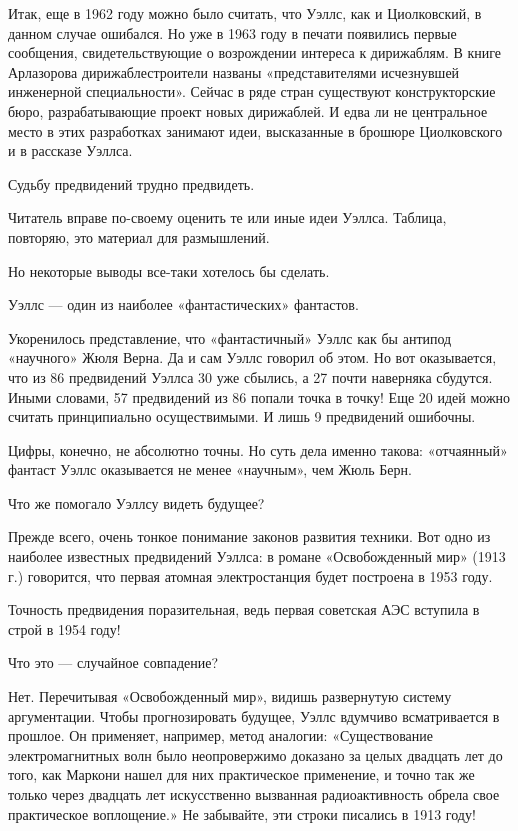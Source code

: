 Итак, еще в 1962 году можно было считать, что Уэллс, как и Циолковский,  в
данном случае  ошибался. Но  уже в  1963 году  в печати  появились  первые
сообщения, свидетельствующие о возрождении интереса к дирижаблям. В  книге
Арлазорова   дирижаблестроители   названы   «представителями   исчезнувшей
инженерной специальности». Сейчас в ряде стран существуют  конструкторские
бюро, разрабатывающие проект  новых дирижаблей. И  едва ли не  центральное
место в этих разработках занимают идеи, высказанные в брошюре Циолковского
и в рассказе Уэллса.

Судьбу предвидений трудно предвидеть.

Читатель вправе  по-своему  оценить  те или  иные  идеи  Уэллса.  Таблица,
повторяю, это материал для размышлений.

Но некоторые выводы все-таки хотелось бы сделать.

Уэллс — один из наиболее «фантастических» фантастов.

Укоренилось  представление,  что  «фантастичный»  Уэллс  как  бы   антипод
«научного» Жюля Верна. Да и сам Уэллс говорил об этом. Но вот оказывается,
что из  86  предвидений  Уэллса  30 уже  сбылись,  а  27  почти  наверняка
сбудутся. Иными словами, 57 предвидений из 86 попали точка в точку! Еще 20
идей можно  считать  принципиально  осуществимыми. И  лишь  9  предвидений
ошибочны.

Цифры,  конечно,  не  абсолютно  точны.   Но  суть  дела  именно   такова:
«отчаянный» фантаст Уэллс оказывается не менее «научным», чем Жюль Берн.

Что же помогало Уэллсу видеть будущее?

Прежде всего, очень тонкое понимание законов развития техники. Вот одно из
наиболее  известных  предвидений  Уэллса:  в  романе  «Освобожденный  мир»
(1913 г.) говорится, что первая  атомная электростанция будет построена  в
1953 году.

Точность предвидения поразительная, ведь  первая советская АЭС вступила  в
строй в 1954 году!

Что это — случайное совпадение?

Нет.  Перечитывая   «Освобожденный   мир»,  видишь   развернутую   систему
аргументации. Чтобы прогнозировать будущее, Уэллс вдумчиво всматривается в
прошлое.  Он   применяет,   например,   метод   аналогии:   «Существование
электромагнитных волн было неопровержимо доказано за целых двадцать лет до
того, как Маркони нашел  для них практическое применение,  и точно так  же
только через двадцать  лет искусственно  вызванная радиоактивность  обрела
свое практическое воплощение.»  Не забывайте, эти  строки писались в  1913
году!

